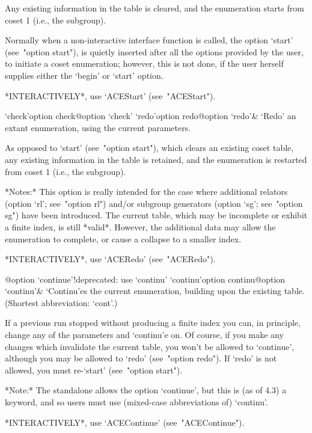Any existing information in the table is cleared, and the  enumeration
starts from coset 1 (i.e., the subgroup).

Normally when a non-interactive {\ACE} interface function  is  called,
the option `start' (see~"option start"), is quietly inserted after all
the options provided by the user, to  initiate  a  coset  enumeration;
however, this is not done, if the user  herself  supplies  either  the
`begin' or `start' option.

*INTERACTIVELY*, use `ACEStart' (see~"ACEStart").

\>`check'{option check}@{option `check'}
\>`redo'{option redo}@{option `redo'}&
`Redo' an extant enumeration, using the current parameters.

As opposed to `start' (see~"option start"), which clears  an  existing
coset table, any existing information in the table  is  retained,  and
the enumeration is restarted from coset 1 (i.e., the subgroup).

*Notes:*
This option is really intended for the case where additional  relators
(option `rl'; see~"option  rl")  and/or  subgroup  generators  (option
`sg'; see~"option sg") have been introduced. The current table,  which
may be incomplete  or  exhibit  a  finite  index,  is  still  *valid*.
However, the additional data may allow the enumeration to complete, or
cause a collapse to a smaller index.

*INTERACTIVELY*, use `ACERedo' (see~"ACERedo").

%
{@option \noexpand`continue'!deprecated: use \noexpand`continu'}
\>`continu'{option continu}@{option `continu'}&
`Continu'es the current enumeration, building upon the existing table.
(Shortest abbreviation: `cont'.)

If a previous run stopped without producing a finite index you can, in
principle, change any of the parameters and `continu'e on. Of  course,
if you make any changes which invalidate the current table, you  won't
be allowed to `continue',  although  you  may  be  allowed  to  `redo'
(see~"option redo"). If `redo' is not  allowed,  you  must  re-`start'
(see~"option start").

*Note:* The {\ACE} standalone allows the option `continue',  but  this
is (as of {\GAP} 4.3) a {\GAP} keyword, and so {\GAP} users  must  use
(mixed-case abbreviations of) `continu'.

*INTERACTIVELY*, use `ACEContinue' (see~"ACEContinue").


